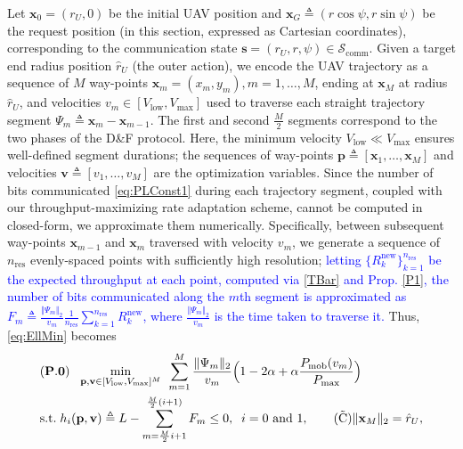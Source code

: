 \documentclass[12pt, draftcls, onecolumn]{IEEEtran}
\theoremstyle{plain}
\theoremstyle{definition}
\theoremstyle{remark}
\newcommand\hlt[1]{\textcolor{blue}{#1}}
\begin{document}
Let $\mathbf x_0=(r_U,0)$ be the initial UAV position and $\mathbf{x}_G{\triangleq}(r\cos{\psi},r\sin{\psi})$ be the request position (in this section, expressed as Cartesian coordinates), corresponding to the communication state $\mathbf{s}{=}(r_{U},r,\psi){\in}\mathcal{S}_{\mathrm{comm}}$. Given a target end radius position $\hat{r}_{U}$ (the outer action), we encode the UAV trajectory as a sequence of $M$ way-points $\mathbf{x}_{m}{=}(x_{m},y_{m}),m=1,\dots,M$, ending at $\mathbf{x}_{M}$ at radius $\hat r_U$, and velocities $v_{m}{\in}[V_{\mathrm{low}},V_{\mathrm{max}}]$ used to traverse each straight trajectory segment $\Psi_{m}{\triangleq}\mathbf{x}_{m}{-}\mathbf{x}_{m{-}1}$. The first and second $\frac{M}{2}$ segments correspond to the two phases of the D\&F protocol. Here, the minimum velocity $V_{\mathrm{low}}{\ll}V_{\mathrm{max}}$  ensures well-defined segment durations; the sequences of way-points $\mathbf{p}{\triangleq}[\mathbf{x}_{1},{\dots},\mathbf{x}_{M}]$ and velocities $\mathbf{v}{\triangleq}[v_{1},{\dots},v_{M}]$ are the optimization variables. Since the number of bits communicated \eqref{eq:PLConst1} during each trajectory segment, coupled with our throughput-maximizing rate adaptation scheme, cannot be computed in closed-form, we approximate them numerically. Specifically, between subsequent way-points $\mathbf{x}_{m-1}$ and $\mathbf{x}_{m}$ traversed with velocity $v_{m}$, we generate a sequence of $n_{\mathrm{res}}$ evenly-spaced points with sufficiently high resolution; \hlt{letting $\{R_{k}^{\mathrm{new}}\}_{k{=}1}^{n_{\mathrm{res}}}$ be the expected throughput at each point,
computed via \eqref{TBar} and Prop. \ref{P1}, the number of bits communicated along the $m$th segment is approximated as $F_{m}{\triangleq}\frac{\Vert\Psi_{m}\Vert_2}{v_m}\frac{1}{n_{\mathrm{res}}}\sum_{k{=}1}^{n_{\mathrm{res}}}R_{k}^{\mathrm{new}}$, where $\frac{\Vert\Psi_{m}\Vert_{2}}{v_{m}}$ is the time taken to traverse it.} Thus, \eqref{eq:EllMin} becomes
\begin{align}
    &(\mathbf{P.0})\;\;\; \underset{\mathbf p,\mathbf v{\in}[V_{\mathrm{low}},V_{\mathrm{max}}]^M}{\mathrm{min}} \;\,  \sum_{m=1}^{M} \frac{\Vert \Psi_m \Vert_2}{v_m}\Big(1-2\alpha+\alpha \frac{P_{\mathrm{mob}}(v_m)}{P_{\max}}\Big) \label{eq:HeurMin}\\
    &\mathrm{s.t.}\; h_{i}(\mathbf p ,\mathbf v) \triangleq L - \sum_{m=\frac{M}{2}i+1}^{\frac{M}{2}(i+1)} F_{m} \leq 0, \;\; i = 0\text{ and }1,\label{eq:NewPLC}\tag{$\tilde{\text{C}}$}
    \Vert\mathbf x_M\Vert_2 = \hat{r}_U,
\end{align}
\end{document}
